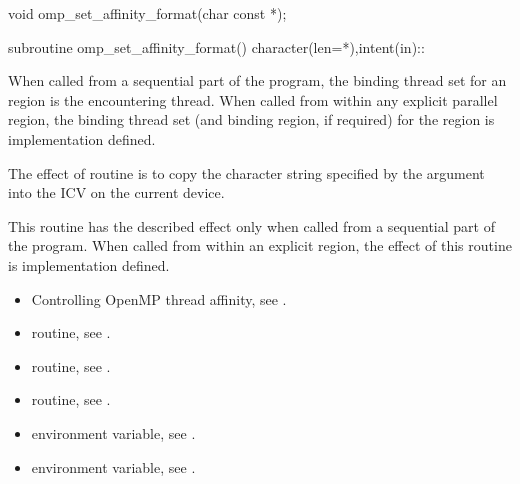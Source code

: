 \format
\begin{ccppspecific}
\begin{ompcFunction}
void omp_set_affinity_format(char const *);
\end{ompcFunction}
\end{ccppspecific}

\begin{fortranspecific}
\begin{ompfSubroutine}
subroutine omp_set_affinity_format()
character(len=*),intent(in)::
\end{ompfSubroutine}
\end{fortranspecific}

\binding
When called from a sequential part of the program, the binding thread set for an
 region is the encountering thread. When called
from within any explicit parallel region, the binding thread set (and binding region, if
required) for the  region is implementation defined.

\effect
The effect of  routine is to copy the
character string specified by the  argument into the
 ICV on the current device.

This routine has the described effect only when called from a sequential part of the
program. When called from within an explicit  region, the effect of this
routine is implementation defined.

\crossreferences
\begin{itemize}
\item Controlling OpenMP thread affinity, see
.
\item {} routine, see .
\item {} routine, see .
\item {} routine, see .
\item {} environment variable, see
.
\item {} environment variable, see
.
\end{itemize}

\subsection{}
\label{subsec:omp_get_affinity_format}

